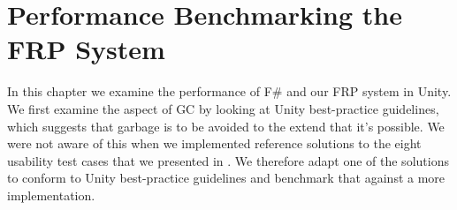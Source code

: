 \section{Performance Benchmarking the FRP System}
In this chapter we examine the performance of F\# and our \gls{FRP} system in Unity. We first examine the aspect of \gls{GC} by looking at Unity best-practice guidelines, which suggests that garbage is to be avoided to the extend that it's possible. We were not aware of this when we implemented reference solutions to the eight usability test cases that we presented in . We therefore adapt one of the solutions to conform to Unity best-practice guidelines and benchmark that against a more  implementation.


